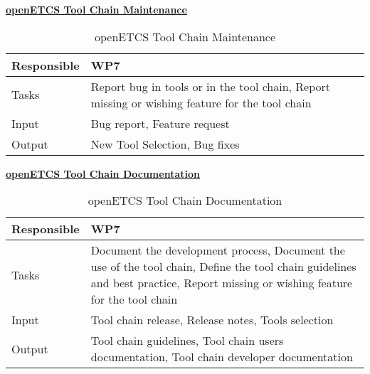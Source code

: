 \documentclass{template/openetcs_article}
\begin{document}
\underline{\textbf{openETCS Tool Chain Maintenance}}
\begin{table}[H]
	\begin{center}
		\begin{supertabular}[H]{|p{6cm}|p{8cm}|}
			\hline
			
			Responsible &
			WP7 \\
			\hline
	
			Tasks &
			Report bug in tools or in the tool chain,
			Report missing or wishing feature for the tool chain \\
			\hline

			Input &
			Bug report,
			Feature request\\
			\hline

			Output &
			New Tool Selection,
			Bug fixes\\
			\hline

		\end{supertabular}
	\end{center}
	\caption{openETCS Tool Chain Maintenance}
\end{table}

\underline{\textbf{openETCS Tool Chain Documentation}}
\begin{table}[H]
	\begin{center}
		\begin{supertabular}[H]{|p{6cm}|p{8cm}|}
			\hline
			Responsible &
			WP7 \\
			\hline
			Tasks &
			Document the development process,
			Document the use of the tool chain,
			Define the tool chain guidelines and best practice,
			Report missing or wishing feature for the tool chain \\
			\hline
			Input &
			Tool chain release,
			Release notes,
			Tools selection\\
			\hline
			Output &
			Tool chain guidelines,
			Tool chain users documentation,
			Tool chain developer documentation\\
			\hline
				
		\end{supertabular}
	\end{center}
	\caption{openETCS Tool Chain Documentation}
\end{table}
\end{document}
